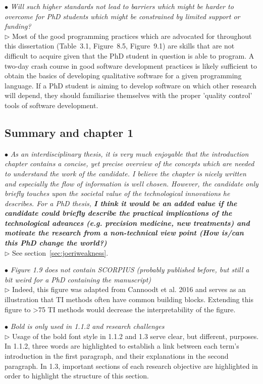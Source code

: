 \documentclass[10pt]{article}
\newcommand{\exam}[2][\  ]{\hspace{0pt}\marginpar{\color{myred}#1}$\bullet$ \textit{#2}}
\newcommand{\imp}[1]{\textbf{#1}}
\newcommand{\nimp}[1]{{\color{mygray} #1}}
\newcommand{\answ}[1]{{\color{myblue} $\triangleright$ #1}}
\newcommand{\bigexclaim}{\raisebox{-0.1em}{\BigTriangleUp}\hspace{-0.32em}\llap{\small\textbf{!}}\hspace{0.32em}}
\newcommand{\tagimp}{\bigexclaim}
\newcommand{\tagtime}{{\Large $\hourglass$}}
\begin{document}
\exam{Will such higher standards not lead to barriers which might
	be harder to overcome for PhD students which might be constrained by limited
	support or funding?} \\
\answ{Most of the good programming practices which are advocated for throughout this dissertation (Table~3.1, Figure~8.5, Figure~9.1) are skills that are not difficult to acquire given that the PhD student in question is able to program. A two-day crash course in good software development practices is likely sufficient to obtain the basics of developing qualitative software for a given programming language. If a PhD student is aiming to develop software on which other research will depend, they should familiarise themselves with the proper 'quality control' tools of software development.}


\subsection{Summary and chapter 1}

\exam[\tagimp \tagtime]{\nimp{As an interdisciplinary thesis, it is very much enjoyable that the introduction
	chapter contains a concise, yet precise overview of the concepts which are
	needed to understand the work of the candidate. I believe the chapter is nicely
	written and especially the flow of information is well chosen. However, the
	candidate only briefly touches upon the societal value of the technological
	innovations he describes. For a PhD thesis, } \imp{I think it would be an added value
	if the candidate could briefly describe the practical implications of the
	technological advances (e.g. precision medicine, new treatments) and
	motivate the research from a non-technical view point (How is/can this PhD
	change the world?)}} \\
\answ{See section~\ref{sec:joeriweakness}.}



\exam{Figure 1.9 does not contain SCORPIUS (probably published before,
	but still a bit weird for a PhD containing the manuscript)} \\
\answ{Indeed, this figure was adapted from Cannoodt et al. 2016 and serves as an illustration that
TI methods often have common building blocks. Extending this figure to >75 TI methods would decrease the interpretability of the figure.}

\exam{Bold is only used in 1.1.2 and research challenges} \\
\answ{Usage of the bold font style in 1.1.2 and 1.3 serve clear, but different, purposes. In 1.1.2, three words are highlighted to establish a link between each term's introduction in the first paragraph, and their explanations in the second paragraph. In 1.3, important sections of each research objective are highlighted in order to highlight the structure of this section.}
\end{document}
